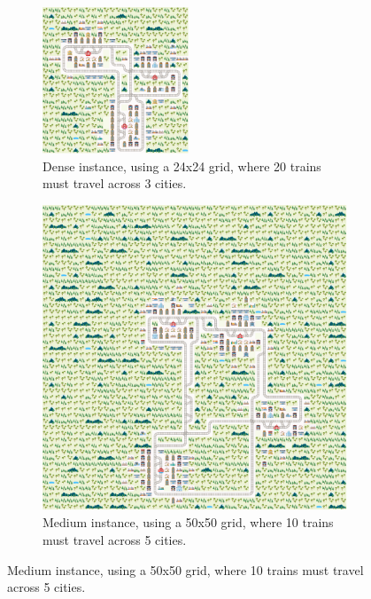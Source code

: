 \documentclass{llncs}
\begin{document}
\begin{figure}	
	\begin{minipage}{.41\textwidth}
		\begin{subfigure}{\textwidth}
			\centering
			\includegraphics[width=0.48\textwidth]{dense/dense_0_1}
			\caption{Dense instance, using a 24x24 grid, where 20 trains must travel across 3 cities.}
			\label{dense_0_1}
		\end{subfigure}
	\hfill
		\begin{subfigure}{\textwidth}
			\centering
			\includegraphics[width=\textwidth]{medium/medium_0_1}
			\caption{Medium instance, using a 50x50 grid, where 10 trains must travel across 5 cities.}
			\label{medium_0_1}
		\end{subfigure}

\end{minipage}
\end{figure}
\end{document}
